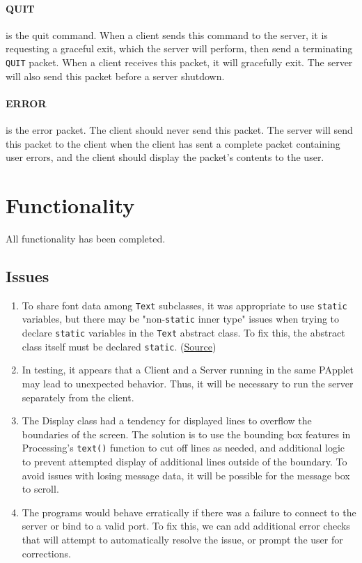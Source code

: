 \documentclass{article}
\begin{document}
\paragraph{QUIT} is the quit command. When a client sends this command to the server, it is requesting a graceful exit, which the server will perform, then send a terminating \verb|QUIT| packet. When a client receives this packet, it will gracefully exit. The server will also send this packet before a server shutdown.

\paragraph{ERROR} is the error packet. The client should never send this packet. The server will send this packet to the client when the client has sent a complete packet containing user errors, and the client should display the packet's contents to the user.

\section{Functionality}
All functionality has been completed.

\subsection{Issues}
\begin{enumerate}
    \item To share font data among \verb|Text| subclasses, it was appropriate to use \verb|static| variables, but there may be "non-\verb|static| inner type" issues when trying to declare \verb|static| variables in the \verb|Text| abstract class. To fix this, the abstract class itself must be declared \verb|static|. (\href{https://forum.processing.org/two/discussion/23623/when-creating-a-class-what-is-it-an-inner-class-of-declared-static-in-a-non-static-inner-type.html}{Source})
    \item In testing, it appears that a Client and a Server running in the same PApplet may lead to unexpected behavior. Thus, it will be necessary to run the server separately from the client.
    \item The Display class had a tendency for displayed lines to overflow the boundaries of the screen. The solution is to use the bounding box features in Processing's \verb|text()| function to cut off lines as needed, and additional logic to prevent attempted display of additional lines outside of the boundary. To avoid issues with losing message data, it will be possible for the message box to scroll.
    \item The programs would behave erratically if there was a failure to connect to the server or bind to a valid port. To fix this, we can add additional error checks that will attempt to automatically resolve the issue, or prompt the user for corrections.
\end{enumerate}
\end{document}
